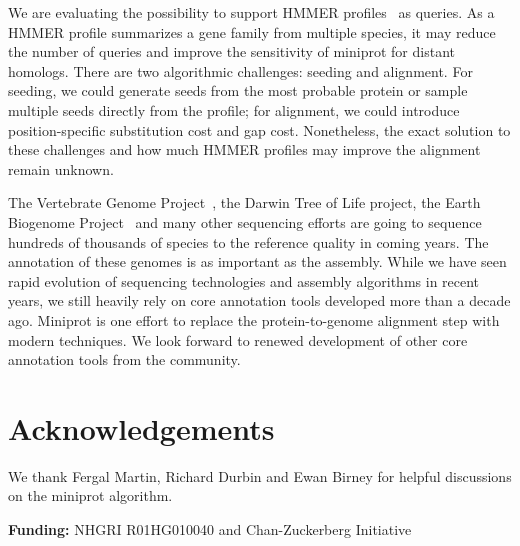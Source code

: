 \documentclass{bioinfo}
\begin{document}
We are evaluating the possibility to support HMMER
profiles~\citep{Eddy:2011tg} as queries. As a HMMER profile summarizes a gene
family from multiple species, it may reduce the number of queries and improve
the sensitivity of miniprot for distant homologs. There are two algorithmic
challenges: seeding and alignment.  For seeding, we could generate seeds from
the most probable protein or sample multiple seeds directly from the profile;
for alignment, we could introduce position-specific substitution cost and gap
cost. Nonetheless, the exact solution to these challenges and how much HMMER
profiles may improve the alignment remain unknown.

The Vertebrate Genome Project~\citep{Rhie:2021ug}, the Darwin Tree of Life
project, the Earth Biogenome Project~\citep{Lewin:2018ve} and many other sequencing efforts are
going to sequence hundreds of thousands of species to the reference quality in
coming years. The annotation of these genomes is as important as the assembly.
While we have seen rapid evolution of sequencing technologies and assembly
algorithms in recent years, we still heavily rely on core annotation tools
developed more than a decade ago. Miniprot is one effort to replace the
protein-to-genome alignment step with modern techniques. We look forward to
renewed development of other core annotation tools from the community.

\section*{Acknowledgements}

We thank Fergal Martin, Richard Durbin and Ewan Birney for helpful discussions
on the miniprot algorithm.

{\bf Funding:} NHGRI R01HG010040 and Chan-Zuckerberg Initiative


\end{document}
